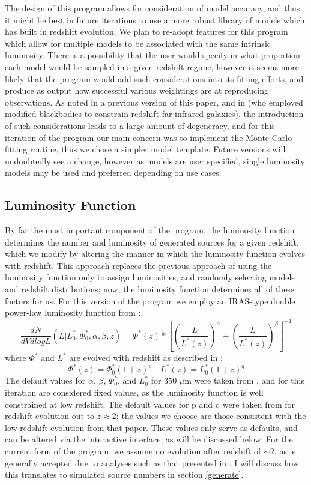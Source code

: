 \documentclass[twocolumn,letterpaper,10pt]{article}
\begin{document}
The design of this program allows for consideration of model accuracy, and thus it might be best in future iterations to use a more robust library of models which has built in redshift evolution. We plan to re-adopt features for this program which allow for multiple models to be associated with the same intrinsic luminosity. There is a possibility that the user would specify in what proportion each model would be sampled in a given redshift regime, however it seems more likely that the program would add such considerations into its fitting efforts, and produce as output how successful various weightings are at reproducing observations. As noted in a previous version of this paper, and in \citet {wiklind03} (who employed modified blackbodies to constrain redshift far-infrared galaxies), the introduction of such considerations leads to a large amount of degeneracy, and for this iteration of the program our main concern was to implement the Monte Carlo fitting routine, thus we chose a simpler model template. Future versions will undoubtedly see a change, however as models are user specified, single luminosity models may be used and preferred depending on use cases.

\subsection{Luminosity Function}

By far the most important component of the program, the luminosity function determines the number and luminosity of generated sources for a given redshift, which we modify by altering the manner in which the luminosity function evolves with redshift. This approach replaces the previous approach of using the luminosity function only to assign luminosities, and randomly selecting models and redshift distributions; now, the luminosity function determines all of these factors for us. For this version of the program we employ an IRAS-type double power-law luminosity function from \citet{negrelloIP}:
$$
\frac{dN}{dV dlogL}(L|L^*_0,\Phi^*_0,\alpha,\beta,z) = \Phi^*(z)*\left[{\left(\frac{L}{L^*(z)}\right)}^{\alpha}+\left(\frac{L}{L^*(z)}\right)^{\beta}\right]^{-1}
$$
where $\Phi^*$ and $L^*$ are evolved with redshift as described in \citet{Caputi07}:
$$
\Phi^*(z) = \Phi^*_0(1+z)^p \quad
L^*(z) = L^*_0(1+z)^q
$$
The default values for $\alpha$, $\beta$, $\Phi^*_0$, and $L^*_0$ for 350 $\mu$m were taken from \citet{negrelloIP}, and for this iteration are considered fixed values, as the luminosity function is well constrained at low redshift. The default values for p and q were taken from \citet{Caputi07} for redshift evolution out to $z\approx2$; the values we choose are those consistent with the low-redshift evolution from that paper. These values only serve as defaults, and can be altered via the interactive interface, as will be discussed below. For the current form of the program, we assume no evolution after redshift of $\sim2$, as is generally accepted due to analyses such as that presented in \citet{marsden11}. I will discuss how this translates to simulated source numbers in section \ref{generate}.
\end{document}
